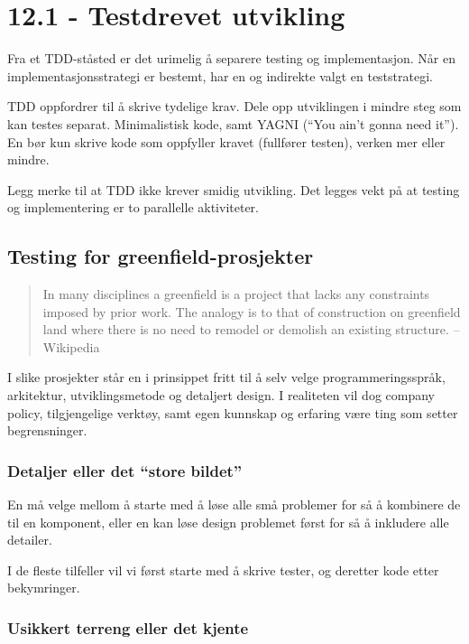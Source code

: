 \section{12.1 - Testdrevet utvikling}

Fra et TDD-ståsted er det urimelig å separere testing og implementasjon.
Når en implementasjonsstrategi er bestemt, har en og indirekte valgt en
teststrategi.

TDD oppfordrer til å skrive tydelige krav. Dele opp utviklingen i mindre
steg som kan testes separat. Minimalistisk kode, samt YAGNI (``You ain't
gonna need it''). En bør kun skrive kode som oppfyller kravet (fullfører
testen), verken mer eller mindre.

Legg merke til at TDD ikke krever smidig utvikling. Det legges vekt på
at testing og implementering er to parallelle aktiviteter.

\subsection{Testing for greenfield-prosjekter}

\begin{quote}
In many disciplines a greenfield is a project that lacks any constraints
imposed by prior work. The analogy is to that of construction on
greenfield land where there is no need to remodel or demolish an
existing structure. -- Wikipedia

\end{quote}
I slike prosjekter står en i prinsippet fritt til å selv velge
programmeringsspråk, arkitektur, utviklingsmetode og detaljert design. I
realiteten vil dog company policy, tilgjengelige verktøy, samt egen
kunnskap og erfaring være ting som setter begrensninger.

\subsubsection{Detaljer eller det ``store bildet''}

En må velge mellom å starte med å løse alle små problemer for så å
kombinere de til en komponent, eller en kan løse design problemet først
for så å inkludere alle detailer.

I de fleste tilfeller vil vi først starte med å skrive tester, og
deretter kode etter bekymringer.

\subsubsection{Usikkert terreng eller det kjente}

